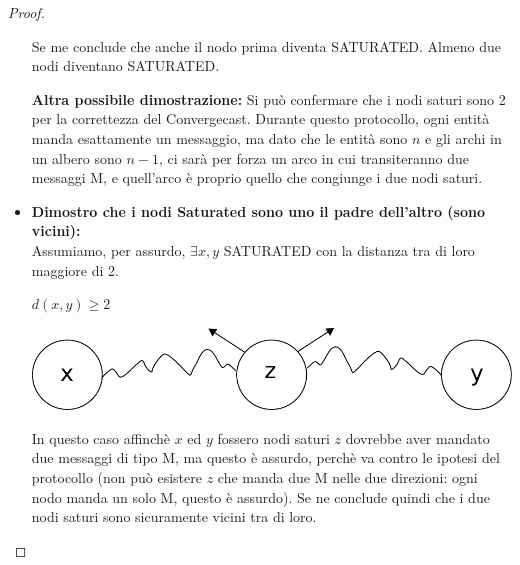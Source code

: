 \begin{proof}
\begin{itemize}
              Se me conclude che anche il nodo prima diventa SATURATED. Almeno due
              nodi diventano SATURATED.

              \textbf{Altra possibile dimostrazione:} Si può confermare che i nodi
              saturi sono 2 per la correttezza del Convergecast. Durante questo
              protocollo, ogni entità manda esattamente un messaggio, ma dato che le
              entità sono $n$ e gli archi in un albero sono $n-1$, ci sarà per forza
              un arco in cui transiteranno due messaggi M, e quell'arco è proprio
              quello che congiunge i due nodi saturi.


        \item \textbf{Dimostro che i nodi Saturated sono uno il padre dell'altro
                  (sono vicini):}\\  Assumiamo, per assurdo, $\exists x,y$ SATURATED con la
              distanza tra di loro maggiore di 2.
              \begin{center}
                  $d(x,y) \geq 2$

                  \includegraphics[scale=0.5]{images/n_41}
              \end{center}

              In questo caso affinchè $x$ ed $y$ fossero nodi saturi $z$ dovrebbe
              aver mandato due messaggi di tipo M, ma questo è assurdo, perchè va
              contro le ipotesi del protocollo (non può esistere $z$ che manda due M
              nelle due direzioni: ogni nodo manda un solo M, questo è assurdo). Se
              ne conclude quindi che i due nodi saturi sono sicuramente vicini tra
              di loro.

    \end{itemize}
\end{proof}



